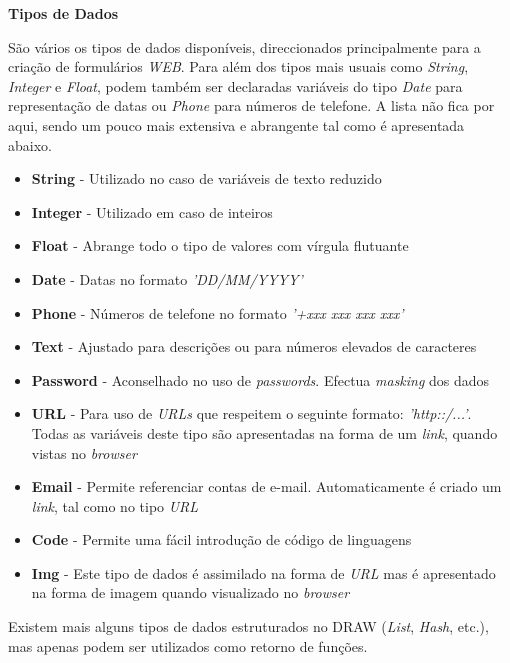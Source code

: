 \documentclass[a4paper]{article}
\begin{document}
\begin{large}
\textbf{Tipos de Dados}\\
\end{large}

\hspace{1cm}São vários os tipos de dados disponíveis, direccionados principalmente para a criação de formulários \emph{WEB}.
Para além dos tipos mais usuais como \emph{String}, \emph{Integer} e \emph{Float}, podem também ser declaradas variáveis do tipo
\emph{Date} para representação de datas ou \emph{Phone} para números de telefone. A lista não fica por aqui, sendo um pouco mais
extensiva e abrangente tal como é apresentada abaixo.\\

\begin{itemize}
        \item \textbf{String} - Utilizado no caso de variáveis de texto reduzido
        \item \textbf{Integer} - Utilizado em caso de inteiros
        \item \textbf{Float} - Abrange todo o tipo de valores com vírgula flutuante
        \item \textbf{Date} - Datas no formato \emph{'DD/MM/YYYY'}
        \item \textbf{Phone} - Números de telefone no formato \emph{'+xxx xxx xxx xxx'}
        \item \textbf{Text} - Ajustado para descrições ou para números elevados de caracteres
        \item \textbf{Password} - Aconselhado no uso de \emph{passwords}. Efectua \emph{masking} dos dados
        \item \textbf{URL} - Para uso de \emph{URLs} que respeitem o seguinte formato: \emph{'http::/...'}. Todas as variáveis deste tipo são
        apresentadas na forma de um \emph{link}, quando vistas no \emph{browser}
        \item \textbf{Email} - Permite referenciar contas de e-mail. Automaticamente é criado um \emph{link}, tal como no tipo \emph{URL}
        \item \textbf{Code} - Permite uma fácil introdução de código de linguagens
        \item \textbf{Img} - Este tipo de dados é assimilado na forma de \emph{URL} mas é apresentado na forma de imagem quando visualizado
        no \emph{browser}
\end{itemize}

\hspace{1cm}Existem mais alguns tipos de dados estruturados no DRAW (\emph{List}, \emph{Hash}, etc.), mas apenas podem ser utilizados
como retorno de funções.\\\\
\end{document}
